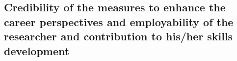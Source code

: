 \subsection{Credibility of the measures to enhance the career perspectives and employability of the researcher and contribution to his/her skills development}
\label{sec:impactresearcher}
